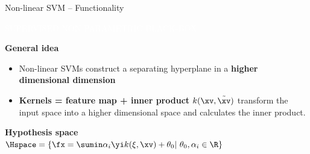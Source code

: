 \documentclass[11pt,compress,t,notes=noshow, xcolor=table]{beamer}
\newcommand{\maketag}[1]{\colorbox{highlightcol}{\textcolor{white}
{\MakeUppercase{#1}}}}
\newcommand{\highlight}[1]{\textcolor{highlightcol}{\textbf{#1}}}
\begin{document}

\begin{frame}{Non-linear SVM -- Functionality}

\footnotesize

\maketag{SUPERVISED}
\maketag{NON PARAMETRIC}
\maketag{BLACK-BOX}

\medskip

\highlight{General idea}
\begin{itemize}

  \item Non-linear SVMs construct a separating hyperplane in a \textbf{higher dimensional dimension}
  \item \textbf{Kernels = feature map + inner product} $k(\xv, \tilde \xv)$ transform the input space into a higher dimensional space and calculates the inner product. 

\end{itemize}

\medskip


\highlight{Hypothesis space} ~~
$\Hspace = \{ \fx = \sumin \alpha_i \yi k(\xi, \xv)  + \theta_0 |\ \theta_0, \alpha_i \in \R \} $


\end{frame}
\end{document}
